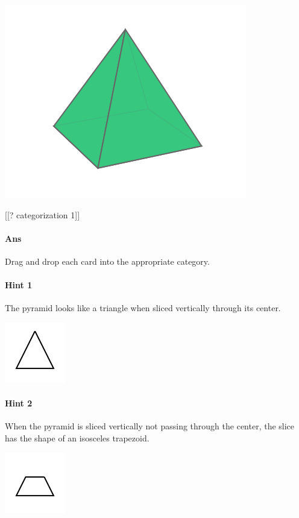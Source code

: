 \documentclass[twocolumn,10pt]{article}
\def\shrinkfactor{0.4}
\begin{document}
\includegraphics[scale=\shrinkfactor]{figures/1d9b248d33b33b47f6b0bcbfae27cf51e2c208c7.png}

[[? categorization 1]]

\paragraph{Ans} Drag and drop each card into the appropriate category. 

\paragraph{Hint 1}The pyramid looks like a triangle when sliced vertically through its center.  

\includegraphics[scale=\shrinkfactor]{figures/d443e0deb4dc18ef30fbf9139d310266f460b66b.png}

\paragraph{Hint 2}When the pyramid is sliced vertically not passing through the center, the slice has the shape of an isosceles trapezoid.   

\includegraphics[scale=\shrinkfactor]{figures/462dbf19e63d9954ed7a531f7ea0e2b0379d9bb9.png}
\end{document}
